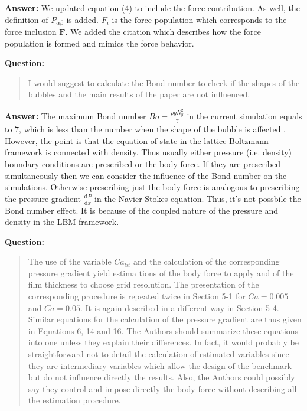 \documentclass{article}
\begin{document}
\textbf{Answer:} We updated equation (4) to include the force contribution. As well, the definition
of $P_{\alpha\beta}$ is added. $F_i$ is the force population which corresponds to the force
inclusion $\bm{F}$. We added the citation which describes how the force population is formed and
mimics the force behavior.

\textbf{Question:}
\begin{quotation}
I would suggest to calculate the Bond number to check if the shapes of the bubbles and the main
results of the paper are not inﬂuenced.
\end{quotation}

\textbf{Answer:} 
The maximum Bond number $Bo=\frac{\rho g N_y^2}{\gamma}$ in the
current simulation equals to $7$, which is less than the number when the shape of the bubble is
affected \cite{zheng-large-ratio}. However, the point is that the equation of state in the lattice
Boltzmann framework is connected with density. Thus usually either pressure (i.e. density) boundary
conditions are prescribed or the body force. If they are prescribed simultaneously then
we can consider the influence of the Bond number on the simulations. Otherwise prescribing just the
body force is analogous to prescribing the pressure gradient $\frac{\mathrm{d}P}{\mathrm{d}x}$ in
the Navier-Stokes equation. Thus, it's not possbile the Bond number effect. It is because of the
coupled nature of the pressure and density in the LBM framework. 

\textbf{Question:}
\begin{quotation}
The use of the variable $Ca_{lit}$ and the calculation of the corresponding pressure gradient yield
estima
tions of the body force to apply and of the ﬁlm thickness to choose grid resolution. The
presentation
of the corresponding procedure is repeated twice in Section 5-1 for $Ca=0.005$ and $Ca=0.05$. It is
again described in a diﬀerent way in Section 5-4. Similar equations for the calculation of the
pressure
gradient are thus given in Equations 6, 14 and 16. The Authors should summarize these equations
into one unless they explain their differences. In fact, it would probably be straightforward not to
detail the calculation of estimated variables since they are intermediary variables which allow the
design of the benchmark but do not inﬂuence directly the results. Also, the Authors could possibly
say they control and impose directly the body force without describing all the estimation procedure.
\end{quotation}
\end{document}
